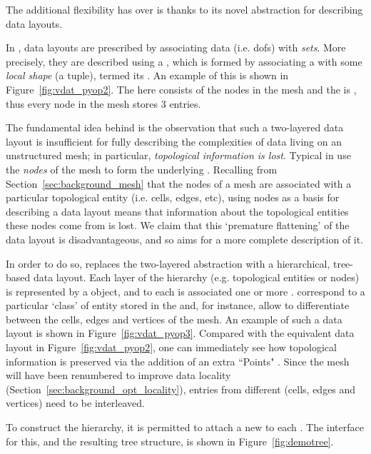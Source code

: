 The additional flexibility  has over  is thanks to its novel abstraction for describing data layouts.

In , data layouts are prescribed by associating data (i.e. \glspl{dof}) with \textit{sets}.
More precisely, they are described using a , which is formed by associating a  with some \textit{local shape} (a tuple), termed its .
An example of this is shown in Figure~\ref{fig:vdat_pyop2}.
The  here consists of the nodes in the mesh and the  is , thus every node in the mesh stores 3 entries.

The fundamental idea behind  is the observation that such a two-layered data layout is insufficient for fully describing the complexities of data living on an unstructured mesh; in particular, \textit{topological information is lost}.
Typical  in  use the \textit{nodes} of the mesh to form the underlying .
Recalling from Section~\ref{sec:background_mesh} that the nodes of a mesh are associated with a particular topological entity (i.e. cells, edges, etc), using nodes as a basis for describing a data layout means that information about the topological entities these nodes come from is lost.
We claim that this `premature flattening' of the data layout is disadvantageous, and so  aims for a more complete description of it.

In order to do so,  replaces the two-layered  abstraction with a hierarchical, tree-based data layout.
Each layer of the hierarchy (e.g. topological entities or nodes) is represented by a  object, and to each  is associated one or more .
 correspond to a particular `class' of entity stored in the  and, for instance, allow  to differentiate between the cells, edges and vertices of the mesh.
An example of such a data layout is shown in Figure~\ref{fig:vdat_pyop3}.
Compared with the equivalent  data layout in Figure~\ref{fig:vdat_pyop2}, one can immediately see how topological information is preserved via the addition of an extra ``Points" .
Since the mesh will have been renumbered to improve data locality (Section~\ref{sec:background_opt_locality}), entries from different  (cells, edges and vertices) need to be interleaved.

To construct the hierarchy, it is permitted to attach a new  to each .
The interface for this, and the resulting tree structure, is shown in Figure~\ref{fig:demotree}.

